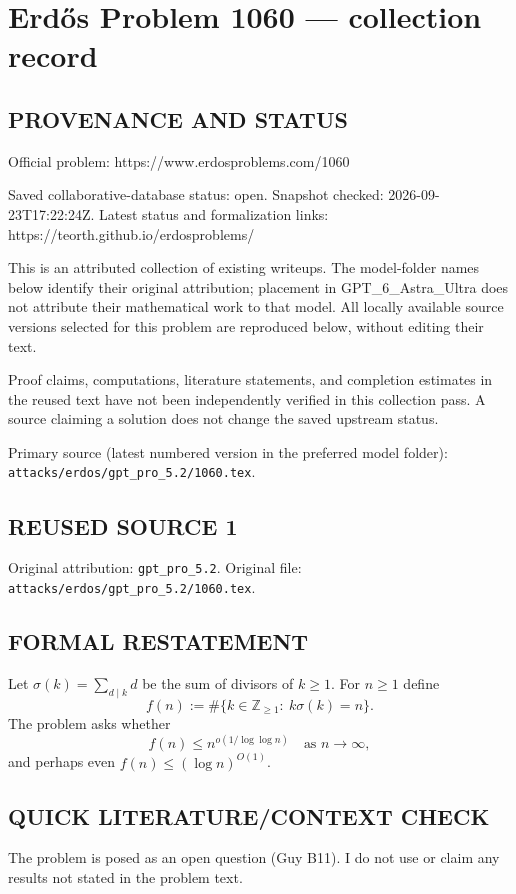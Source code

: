 \section*{Erd\H{o}s Problem 1060 --- collection record}

\subsection*{PROVENANCE AND STATUS}
Official problem: https://www.erdosproblems.com/1060

Saved collaborative-database status: open.
Snapshot checked: 2026-09-23T17:22:24Z.
Latest status and formalization links: https://teorth.github.io/erdosproblems/

This is an attributed collection of existing writeups. The model-folder names below identify their original attribution; placement in GPT\_6\_Astra\_Ultra does not attribute their mathematical work to that model. All locally available source versions selected for this problem are reproduced below, without editing their text.

Proof claims, computations, literature statements, and completion estimates in the reused text have not been independently verified in this collection pass. A source claiming a solution does not change the saved upstream status.

Primary source (latest numbered version in the preferred model folder): \texttt{attacks/erdos/gpt\_pro\_5.2/1060.tex}.

\subsection*{REUSED SOURCE 1}
Original attribution: \texttt{gpt\_pro\_5.2}.
Original file: \texttt{attacks/erdos/gpt\_pro\_5.2/1060.tex}.


\subsection*{FORMAL RESTATEMENT}
Let $\sigma(k)=\sum_{d\mid k} d$ be the sum of divisors of $k\ge 1$. For $n\ge 1$ define
\[
f(n):=\#\{k\in\mathbb Z_{\ge 1}:\ k\sigma(k)=n\}.
\]
The problem asks whether
\[
f(n)\le n^{o(1/\log\log n)}\quad\text{as }n\to\infty,
\]
and perhaps even $f(n)\le (\log n)^{O(1)}$.

\subsection*{QUICK LITERATURE/CONTEXT CHECK}
The problem is posed as an open question (Guy B11). I do not use or claim any results not stated in the problem text.

